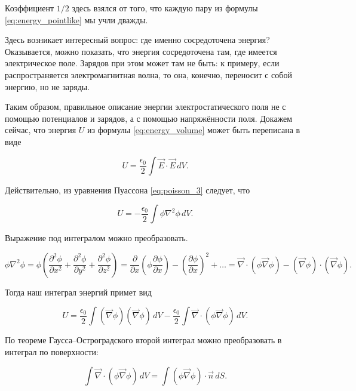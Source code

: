 \documentclass[11pt,a4paper]{article}
\numberwithin{equation}{section}
\newcommand{\pt}{\partial}
\newcommand{\vn}{\vec{\nabla}}
\newcommand{\eps}{\epsilon}
\begin{document}
Коэффициент $1/2$ здесь взялся от того, что каждую пару из формулы
\eqref{eq:energy_pointlike} мы учли дважды. 

Здесь возникает интересный вопрос: где именно сосредоточена энергия?
Оказывается, можно показать, что энергия сосредоточена там, где
имеется электрическое поле. Зарядов при этом может там не быть: к
примеру, если распространяется электромагнитная волна, то она,
конечно, переносит с собой энергию, но не заряды. 

Таким образом, правильное описание энергии электростатического поля не
с помощью потенциалов и зарядов, а с помощью напряжённости
поля. Докажем сейчас, что энергия $U$ из формулы
\eqref{eq:energy_volume} может быть переписана в виде

\begin{equation}
  \label{eq:energy_field}
  U = \frac{\eps_0}{2} \int \vec{E} \cdot \vec{E} \, dV.
\end{equation}

Действительно, из уравнения Пуассона \eqref{eq:poisson_3} следует, что 

\begin{equation}
  \label{eq:energy_field_der_1}
  U = - \frac{\eps_0}{2} \int \phi \nabla^2 \phi \, dV.
\end{equation}

Выражение под интегралом можно преобразовать. 

\begin{equation}
  \label{eq:energy_field_der_2}
\phi \nabla^2 \phi = \phi \left( \frac{\pt^2 \phi}{\pt x^2} +
  \frac{\pt^2 \phi}{\pt y^2} +\frac{\pt^2 \phi}{\pt z^2} \right) =
\frac{\pt}{\pt x} \left( \phi \frac{\pt \phi}{\pt x} \right) - \left(
  \frac{\pt\phi}{\pt x} \right)^2 + \ldots = \vn \cdot (\phi \vn \phi)
- (\vn \phi) \cdot (\vn \phi).
\end{equation}

Тогда наш интеграл энергий примет вид

\begin{equation}
  \label{eq:energy_field_der_3}
  U = \frac{\eps_0}{2} \int (\vn \phi) (\vn \phi) \, dV -
  \frac{\eps_0}{2} \int \vn \cdot (\phi \vn \phi)\, dV.
\end{equation}

По теореме Гаусса--Остроградского второй интеграл можно преобразовать
в интеграл по поверхности: 

\begin{equation}
  \label{eq:energy_field_der_4}
   \int \vn \cdot (\phi \vn \phi)\, dV = \int (\phi \vn \phi) \cdot
   \vec{n}\, dS.
\end{equation}
\end{document}
